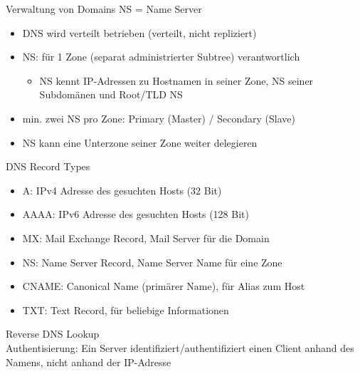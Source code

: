 \begin{concept}{Verwaltung von Domains} NS = Name Server
    \begin{itemize}
        \item DNS wird verteilt betrieben (verteilt, nicht repliziert)
        \item NS: für 1 Zone (separat administrierter Subtree) verantwortlich
        \begin{itemize}
            \item NS kennt IP-Adressen zu Hostnamen in seiner Zone, NS seiner Subdomänen und Root/TLD NS
        \end{itemize}
        \item min. zwei NS pro Zone: Primary (Master) / Secondary (Slave) 
        \item NS kann eine Unterzone seiner Zone weiter delegieren
    \end{itemize}
\end{concept}

\begin{definition}{DNS Record Types}
    \begin{itemize}
        \item A: IPv4 Adresse des gesuchten Hosts (32 Bit)
        \item AAAA: IPv6 Adresse des gesuchten Hosts (128 Bit)
        \item MX: Mail Exchange Record, Mail Server für die Domain 
        \item NS: Name Server Record, Name Server Name für eine Zone
        \item CNAME: Canonical Name (primärer Name), für Alias zum Host
        \item TXT: Text Record, für beliebige Informationen
    \end{itemize}
\end{definition}

\begin{definition}{Reverse DNS Lookup}\\
    Authentisierung: Ein Server identifiziert/authentifiziert einen Client anhand des Namens, nicht anhand der IP-Adresse
\end{definition}

